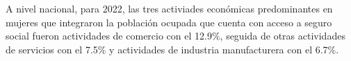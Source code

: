 A nivel nacional, para 2022, las tres activiades económicas predominantes en mujeres que integraron la población ocupada que cuenta con acceso a seguro social fueron actividades de comercio con el 12.9\%, seguida de otras actividades de servicios con el 7.5\% y actividades de industria manufacturera con el 6.7\%.